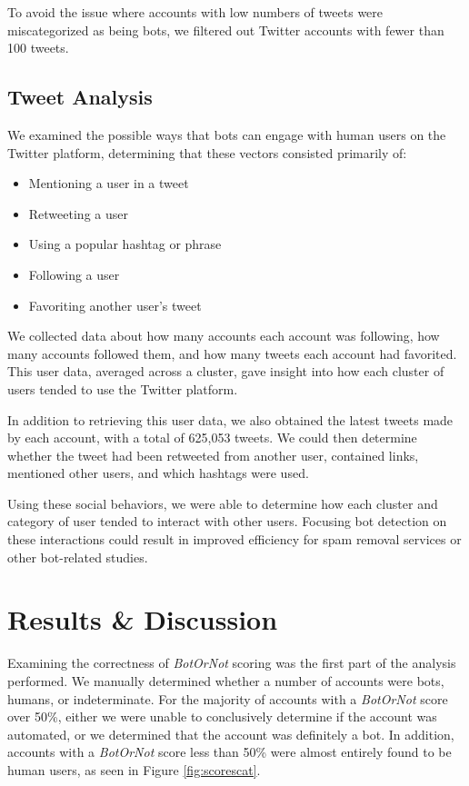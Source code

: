 \documentclass{sig-alternate-05-2015}
\begin{document}
To avoid the issue where accounts with low numbers of tweets were miscategorized as being bots, we filtered out Twitter accounts with fewer than 100 tweets.

\subsection{Tweet Analysis}

We examined the possible ways that bots can engage with human users on the Twitter platform, determining that these vectors consisted primarily of:
\begin{itemize}
	\item Mentioning a user in a tweet
	\item Retweeting a user
	\item Using a popular hashtag or phrase
	\item Following a user
	\item Favoriting another user's tweet
\end{itemize}
We collected data about how many accounts each account was following, how many accounts followed them, and how many tweets each account had favorited. This user data, averaged across a cluster, gave insight into how each cluster of users tended to use the Twitter platform.

In addition to retrieving this user data, we also obtained the latest tweets made by each account, with a total of 625,053 tweets. We could then determine whether the tweet had been retweeted from another user, contained links, mentioned other users, and which hashtags were used.

Using these social behaviors, we were able to determine how each cluster and category of user tended to interact with other users. Focusing bot detection on these interactions could result in improved efficiency for spam removal services or other bot-related studies.

\section{Results \& Discussion}

Examining the correctness of \emph{BotOrNot} scoring was the first part of the analysis performed. We manually determined whether a number of accounts were bots, humans, or indeterminate. For the majority of accounts with a \emph{BotOrNot} score over 50\%, either we were unable to conclusively determine if the account was automated, or we determined that the account was definitely a bot. In addition, accounts with a \emph{BotOrNot} score less than 50\% were almost entirely found to be human users, as seen in Figure \ref{fig:scorescat}.
\end{document}

